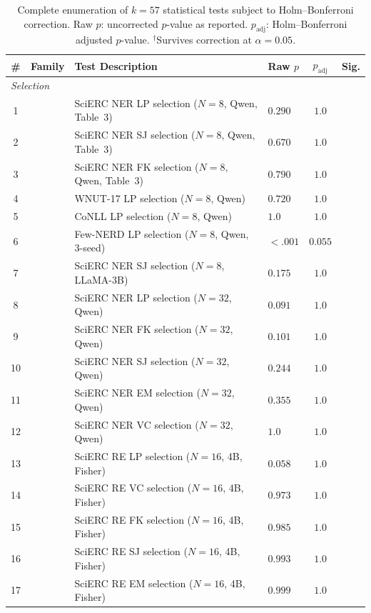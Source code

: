 \begin{table}[t]
\centering
\footnotesize
\renewcommand{\arraystretch}{0.88}
\caption{Complete enumeration of $k{=}57$ statistical tests subject to Holm--Bonferroni correction. Raw $p$: uncorrected $p$-value as reported. $p_{\text{adj}}$: Holm--Bonferroni adjusted $p$-value. $^\dagger$Survives correction at $\alpha{=}0.05$.}
\label{tab:holm_family}
\begin{tabular}{clllcc}
\toprule
\# & Family & Test Description & Raw $p$ & $p_{\text{adj}}$ & Sig. \\
\midrule
\multicolumn{6}{l}{\textit{Selection}} \\
1 & & SciERC NER LP selection ($N{=}8$, Qwen, Table~3) & $0.290$ & $1.0$ &  \\
2 & & SciERC NER SJ selection ($N{=}8$, Qwen, Table~3) & $0.670$ & $1.0$ &  \\
3 & & SciERC NER FK selection ($N{=}8$, Qwen, Table~3) & $0.790$ & $1.0$ &  \\
4 & & WNUT-17 LP selection ($N{=}8$, Qwen) & $0.720$ & $1.0$ &  \\
5 & & CoNLL LP selection ($N{=}8$, Qwen) & $1.0$ & $1.0$ &  \\
6 & & Few-NERD LP selection ($N{=}8$, Qwen, 3-seed) & ${<}.001$ & $0.055$ & \\
7 & & SciERC NER SJ selection ($N{=}8$, LLaMA-3B) & $0.175$ & $1.0$ &  \\
8 & & SciERC NER LP selection ($N{=}32$, Qwen) & $0.091$ & $1.0$ &  \\
9 & & SciERC NER FK selection ($N{=}32$, Qwen) & $0.101$ & $1.0$ &  \\
10 & & SciERC NER SJ selection ($N{=}32$, Qwen) & $0.244$ & $1.0$ &  \\
11 & & SciERC NER EM selection ($N{=}32$, Qwen) & $0.355$ & $1.0$ &  \\
12 & & SciERC NER VC selection ($N{=}32$, Qwen) & $1.0$ & $1.0$ &  \\
13 & & SciERC RE LP selection ($N{=}16$, 4B, Fisher) & $0.058$ & $1.0$ &  \\
14 & & SciERC RE VC selection ($N{=}16$, 4B, Fisher) & $0.973$ & $1.0$ &  \\
15 & & SciERC RE FK selection ($N{=}16$, 4B, Fisher) & $0.985$ & $1.0$ &  \\
16 & & SciERC RE SJ selection ($N{=}16$, 4B, Fisher) & $0.993$ & $1.0$ &  \\
17 & & SciERC RE EM selection ($N{=}16$, 4B, Fisher) & $0.999$ & $1.0$ &  \\

\end{tabular}
\end{table}

